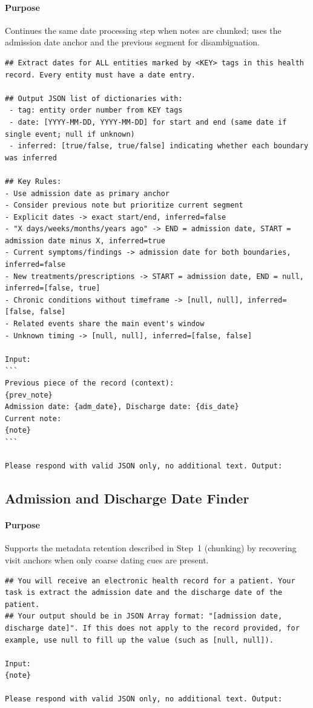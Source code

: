 \paragraph{Purpose} Continues the same date processing step when notes are chunked; uses the admission date anchor and the previous segment for disambiguation.
\begin{lstlisting}
## Extract dates for ALL entities marked by <KEY> tags in this health record. Every entity must have a date entry.

## Output JSON list of dictionaries with:
 - tag: entity order number from KEY tags
 - date: [YYYY-MM-DD, YYYY-MM-DD] for start and end (same date if single event; null if unknown)
 - inferred: [true/false, true/false] indicating whether each boundary was inferred

## Key Rules:
- Use admission date as primary anchor
- Consider previous note but prioritize current segment
- Explicit dates -> exact start/end, inferred=false
- "X days/weeks/months/years ago" -> END = admission date, START = admission date minus X, inferred=true
- Current symptoms/findings -> admission date for both boundaries, inferred=false
- New treatments/prescriptions -> START = admission date, END = null, inferred=[false, true]
- Chronic conditions without timeframe -> [null, null], inferred=[false, false]
- Related events share the main event's window
- Unknown timing -> [null, null], inferred=[false, false]

Input:
```
Previous piece of the record (context):
{prev_note}
Admission date: {adm_date}, Discharge date: {dis_date}
Current note:
{note}
```

Please respond with valid JSON only, no additional text. Output:
\end{lstlisting}

\subsection{Admission and Discharge Date Finder}
\paragraph{Purpose} Supports the metadata retention described in Step~1 (chunking) by recovering visit anchors when only coarse dating cues are present.
\begin{lstlisting}
## You will receive an electronic health record for a patient. Your task is extract the admission date and the discharge date of the patient.
## Your output should be in JSON Array format: "[admission date, discharge date]". If this does not apply to the record provided, for example, use null to fill up the value (such as [null, null]).

Input:
{note}

Please respond with valid JSON only, no additional text. Output:
\end{lstlisting}

